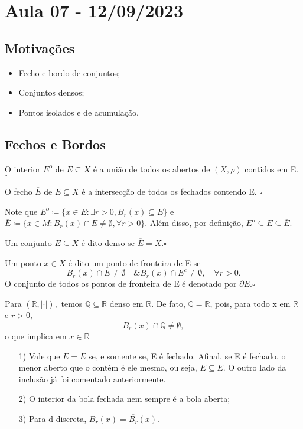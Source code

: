 \documentclass[MetricSpaces/metric_notes.tex]{subfiles}
\begin{document}
\section{Aula 07 - 12/09/2023}
\subsection{Motivações}
\begin{itemize}
	\item Fecho e bordo de conjuntos;
	\item Conjuntos densos;
	\item Pontos isolados e de acumulação.
\end{itemize}
\subsection{Fechos e Bordos}
\begin{def*}
	O interior \({E}^{\mathrm{o}}\) de \(E\subseteq{X}\) é a união de todos os abertos de \((X, \rho )\) contidos em E. \(\square\)
\end{def*}
\begin{def*}
	O fecho \(\overline{E}\) de \(E\subseteq{X}\) é a intersecção de todos os fechados contendo E. \(\square\)
\end{def*}
Note que \({E}^{\mathrm{o}}\coloneqq \{x\in E: \exists r > 0, B_{r}(x)\subseteq{E}\}\) e \(\overline{E}\coloneqq \{x\in M: B_{r}(x)\cap E \neq\emptyset, \forall r>0\}\).
Além disso, por definição, \({E}^{\mathrm{o}}\subseteq{E}\subseteq{\overline{E}}\).
\begin{def*}
	Um conjunto \(E\subseteq{X}\) é dito denso se \(\overline{E}=X.\square\)
\end{def*}
\begin{def*}
	Um ponto \(x\in X\) é dito um ponto de fronteira de E se
	\[
		B_{r}(x)\cap E \neq\emptyset\quad\& B_{r}(x)\cap E^{c}\neq\emptyset,\quad \forall r>0.
	\]
	O conjunto de todos os pontos de fronteira de E é denotado por \(\partial E.\square\)
\end{def*}
\begin{example}
	Para \((\mathbb{R}, |\cdot |),\) temos \(\mathbb{Q}\subseteq{\mathbb{R}}\) denso em \(\mathbb{R}\).
	De fato, \(\mathbb{Q}=\mathbb{R}\), pois, para todo x em \(\mathbb{R}\) e \(r > 0\),
	\[
		B_{r}(x)\cap \mathbb{Q}\neq\emptyset,
	\]
	o que implica em \(x\in \overline{\mathbb{R}}\)
\end{example}
\begin{example}
	\begin{itemize}
		\item[1)] Vale que \(E = \overline{E}\) se, e somente se, E é fechado. Afinal, se E é fechado, o menor aberto
		      que o contém é ele mesmo, ou seja, \(\overline{E}\subseteq{E}\). O outro lado da inclusão já foi comentado anteriormente.
		\item[2)] O interior da bola fechada nem sempre é a bola aberta;
		\item[3)] Para d discreta, \(B_{r}(x) = \overline{B_{r}}(x).\)
	\end{itemize}
\end{example}
\end{document}
